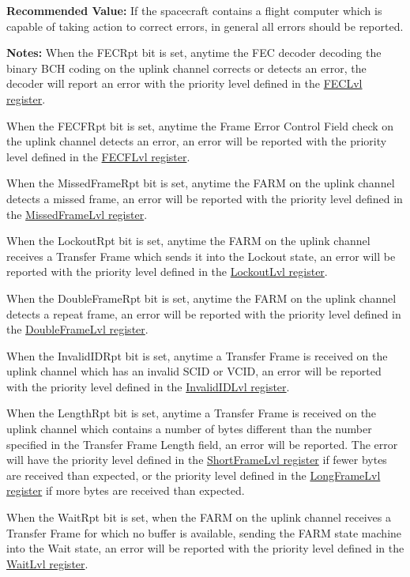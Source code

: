 \documentclass{hitec}
\begin{document}
\noindent \textbf{Recommended Value:} If the spacecraft contains a flight
computer which is capable of taking action to correct errors, in general all
errors should be reported.

\noindent \textbf{Notes:} When the FECRpt bit is set, anytime the FEC decoder
decoding the binary BCH coding on the uplink channel corrects or detects an
error, the decoder will report an error with the priority level defined in the
\hyperref[reg:feclvl]{FECLvl register}.

When the FECFRpt bit is set, anytime the Frame Error Control Field check on the
uplink channel detects an error, an error will be reported with the priority
level defined in the \hyperref[reg:fecflvl]{FECFLvl register}.

When the MissedFrameRpt bit is set, anytime the FARM on the uplink channel
detects a missed frame, an error will be reported with the priority
level defined in the \hyperref[reg:missedframelvl]{MissedFrameLvl register}.

When the LockoutRpt bit is set, anytime the FARM on the uplink channel receives
a Transfer Frame which sends it into the Lockout state, an error will be
reported with the priority level defined in the
\hyperref[reg:lockoutlvl]{LockoutLvl register}.

When the DoubleFrameRpt bit is set, anytime the FARM on the uplink channel
detects a repeat frame, an error will be reported with the priority
level defined in the \hyperref[reg:doubleframelvl]{DoubleFrameLvl register}.

When the InvalidIDRpt bit is set, anytime a Transfer Frame is received on the
uplink channel which has an invalid SCID or VCID, an error will be reported
with the priority level defined in the \hyperref[reg:invalididlvl]{InvalidIDLvl
register}.

When the LengthRpt bit is set, anytime a Transfer Frame is received on the
uplink channel which contains a number of bytes different than the number
specified in the Transfer Frame Length field, an error will be reported.
The error will have the priority level defined in the
\hyperref[reg:shortframelvl]{ShortFrameLvl register} if fewer bytes are
received than expected, or the priority level defined in the
\hyperref[reg:longframelvl]{LongFrameLvl register} if more bytes are received
than expected.

When the WaitRpt bit is set, when the FARM on the uplink channel receives a
Transfer Frame for which no buffer is available, sending the FARM state machine
into the Wait state, an error will be reported with the priority level defined
in the \hyperref[reg:waitlvl]{WaitLvl register}.
\end{document}

